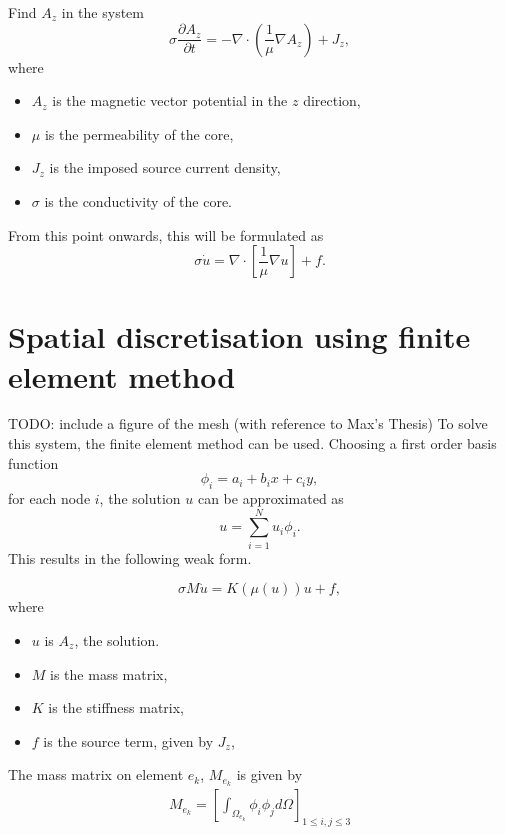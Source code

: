 \begin{problem}
    Find $A_z$ in the system
    \begin{equation}
        \sigma\frac{\partial A_z}{\partial t} = - \nabla \cdot \left(\frac{1}{\mu} \nabla A_z \right) + J_z,
    \end{equation}
    where
    \begin{itemize}
        \item $A_z$ is the magnetic vector potential in the $z$ direction,
        \item $\mu$ is the permeability of the core,
        \item $J_z$ is the imposed source current density,
        \item $\sigma$ is the conductivity of the core.
    \end{itemize}
    From this point onwards, this will be formulated as
    \begin{equation}
        \sigma\dot u = \nabla \cdot \left[\frac{1}{\mu}\nabla u\right] + f.
    \end{equation}
\end{problem}

\newpage
\section{Spatial discretisation using finite element method}
TODO: include a figure of the mesh (with reference to Max's Thesis)
To solve this system, the finite element method can be used. Choosing a first order basis function 
\[
    \phi_i = a_i + b_i x + c_i y,
\]
for each node $i$, the solution $u$ can be approximated as
\[
    u = \sum_{i=1}^N u_i \phi_i.
\]
This results in the following weak form.
\begin{weakform}
    \begin{equation}
        \sigma M \dot u = K(\mu(u)) u + f,
        \label{eqn:weakform}
    \end{equation}
    where
    \begin{itemize}
        \item $u$ is $A_z$, the solution.
        \item $M$ is the mass matrix,
        \item $K$ is the stiffness matrix,
        \item $f$ is the source term, given by $J_z$,
    \end{itemize}
\end{weakform}

\noindent The mass matrix on element $e_k$,  $M_{e_k}$ is given by
\begin{align*}
    M_{e_k} = \left[\int_{\Omega_{e_k}}\phi_i\phi_j d\Omega \right]_{1 \leq i, j \leq 3}
\end{align*}

